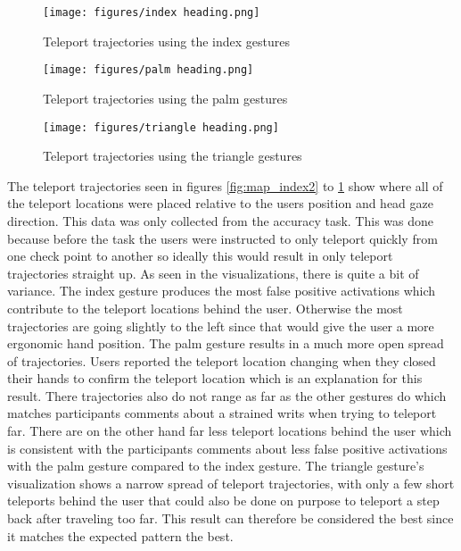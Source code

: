 \begin{figure}[!htb]
        \texttt{[image: figures/index heading.png]}
        \caption{Teleport trajectories using the index gestures}\label{fig:map_index2}
    \endminipage\hfill
        \texttt{[image: figures/palm heading.png]}
        \caption{Teleport trajectories using the palm gestures}\label{fig:map_palm2}
    \endminipage\hfill
        \texttt{[image: figures/triangle heading.png]}
        \caption{Teleport trajectories using the triangle gestures}\label{fig:map_triangle2}
    \endminipage
\end{figure}

The teleport trajectories seen in figures \ref{fig:map_index2} to \ref{fig:map_triangle2} show where all of the teleport locations were placed relative to the users position and head gaze direction. This data was only collected from the accuracy task. This was done because before the task the users were instructed to only teleport quickly from one check point to another so ideally this would result in only teleport trajectories straight up. As seen in the visualizations, there is quite a bit of variance. The index gesture produces the most false positive activations which contribute to the teleport locations behind the user. Otherwise the most trajectories are going slightly to the left since that would give the user a more ergonomic hand position. The palm gesture results in a much more open spread of trajectories. Users reported the teleport location changing when they closed their hands to confirm the teleport location which is an explanation for this result. There trajectories also do not range as far as the other gestures do which matches participants comments about a strained writs when trying to teleport far. There are on the other hand far less teleport locations behind the user which is consistent with the participants comments about less false positive activations with the palm gesture compared to the index gesture. The triangle gesture's visualization shows a narrow spread of teleport trajectories, with only a few short teleports behind the user that could also be done on purpose to teleport a step back after traveling too far. This result can therefore be considered the best since it matches the expected pattern the best. 

